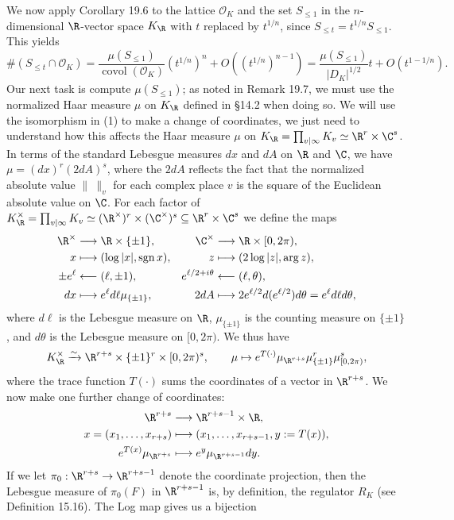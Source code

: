 We now apply Corollary 19.6 to the lattice $\mathcal O_K$ and the set $S_{\leq1}$ in the $n$-dimensional $\R$-vector space $K_\R$ with $t$ replaced by $t^{1/n}$, since $S_{\leq t}=t^{1/n}S_{\leq1}$. This yields
\[
\#(S_{\leq t}\cap\mathcal O_K)=\frac{\mu(S_{\leq1})}{\operatorname{covol}(\mathcal O_K)}(t^{1/n})^n+O((t^{1/n})^{n-1})
=\frac{\mu(S_{\leq1})}{|D_K|^{1/2}}t+O(t^{1-1/n}).\tag{2}
\]
Our next task is compute $\mu(S_{\leq1})$; as noted in Remark 19.7, we must use the normalized Haar measure $\mu$ on $K_\R$ defined in \S14.2 when doing so. We will use the isomorphism in (1) to make a change of coordinates, we just need to understand how this affects the Haar measure $\mu$ on $K_\R=\prod_{v\mid\infty}K_v\simeq\R^r\times\C^s$. In terms of the standard Lebesgue measures $dx$ and $dA$ on $\R$ and $\C$, we have $\mu=(dx)^r(2dA)^s$, where the $2dA$ reflects the fact that the normalized absolute value $\|\ \|_v$ for each complex place $v$ is the square of the Euclidean absolute value on $\C$. For each factor of $K_\R^\times=\prod_{v\mid\infty}K_v\simeq(\R^\times)^r\times(\C^\times)^s\subseteq\R^r\times\C^s$ we define the maps
\begin{align*}
\R^\times&\longrightarrow\R\times\{\pm1\},&\C^\times&\longrightarrow\R\times[0,2\pi),\\
x&\longmapsto(\log|x|,\operatorname{sgn}x),&z&\longmapsto(2\log|z|,\arg z),\\
\pm e^\ell&\longleftarrow(\ell,\pm1),&e^{\ell/2+i\theta}&\longleftarrow(\ell,\theta),\\
dx&\longmapsto e^\ell d\ell\mu_{\{\pm1\}},&2dA&\longmapsto2e^{\ell/2}d(e^{\ell/2})d\theta=e^\ell d\ell d\theta,
\end{align*}
where $d\ell$ is the Lebesgue measure on $\R$, $\mu_{\{\pm1\}}$ is the counting measure on $\{\pm1\}$, and $d\theta$ is the Lebesgue measure on $[0,2\pi)$. We thus have
\[
K_\R^\times\xrightarrow{\sim}\R^{r+s}\times\{\pm1\}^r\times[0,2\pi)^s,\qquad
\mu\mapsto e^{T(\cdot)}\mu_{\R^{r+s}}\mu_{\{\pm1\}}^r\mu_{[0,2\pi)}^s,
\]
where the trace function $T(\cdot)$ sums the coordinates of a vector in $\R^{r+s}$. We now make one further change of coordinates:
\begin{align*}
\R^{r+s}&\longrightarrow\R^{r+s-1}\times\R,\\
x=(x_1,\ldots,x_{r+s})&\longmapsto(x_1,\ldots,x_{r+s-1},y:=T(x)),\\
e^{T(x)}\mu_{\R^{r+s}}&\longmapsto e^y\mu_{\R^{r+s-1}}dy.
\end{align*}
If we let $\pi_0:\R^{r+s}\to\R^{r+s-1}$ denote the coordinate projection, then the Lebesgue measure of $\pi_0(F)$ in $\R^{r+s-1}$ is, by definition, the regulator $R_K$ (see Definition 15.16). The Log map gives us a bijection
